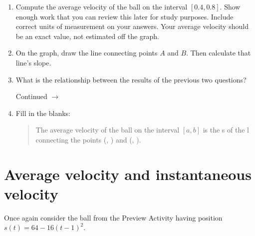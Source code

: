 \documentclass[11pt]{article}
\def\ra{\rightarrow}
\def\pageturn{\vfill 
\begin{flushright}
	\begin{small}
		Continued $\ra$
	\end{small}
\end{flushright} \newpage}
\begin{document}
\begin{enumerate}
	\item Compute the average velocity of the ball on the interval $[0.4, 0.8]$. Show enough work that you can review this later for study purposes. Include correct units of measurement on your answers. Your average velocity should be an exact value, not estimated off the graph.
	
	\vspace{1in}
	
	\item On the graph, draw the line connecting points $A$ and $B$. Then calculate that line's slope. 
	
	\item What is the relationship between the results of the previous two questions? 
	
	\pageturn
	
	\item Fill in the blanks: 
	\begin{quote}
		The average velocity of the ball on the interval $[a,b]$ is the s\underline{\hspace{1in}} of the l\underline{\hspace{1in}} connecting the points 
		(\underline{\hspace{0.25in}}, \underline{\hspace{0.25in}}) and (\underline{\hspace{0.25in}}, \underline{\hspace{0.25in}}). 
 	\end{quote} 
\end{enumerate}

\section{Average velocity and instantaneous velocity}	
		
Once again consider the ball from the Preview Activity having position $s(t) = 64 - 16(t-1)^2$. 
\end{document}
